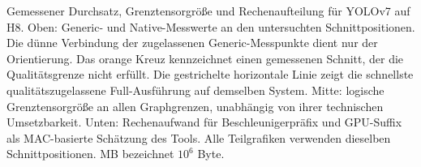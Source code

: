 Gemessener Durchsatz, Grenztensorgröße und Rechenaufteilung für YOLOv7 auf H8. Oben: Generic- und Native-Messwerte an den untersuchten Schnittpositionen. Die dünne Verbindung der zugelassenen Generic-Messpunkte dient nur der Orientierung. Das orange Kreuz kennzeichnet einen gemessenen Schnitt, der die Qualitätsgrenze nicht erfüllt. Die gestrichelte horizontale Linie zeigt die schnellste qualitätszugelassene Full-Ausführung auf demselben System. Mitte: logische Grenztensorgröße an allen Graphgrenzen, unabhängig von ihrer technischen Umsetzbarkeit. Unten: Rechenaufwand für Beschleunigerpräfix und GPU-Suffix als MAC-basierte Schätzung des Tools. Alle Teilgrafiken verwenden dieselben Schnittpositionen. MB bezeichnet $10^6$ Byte.

